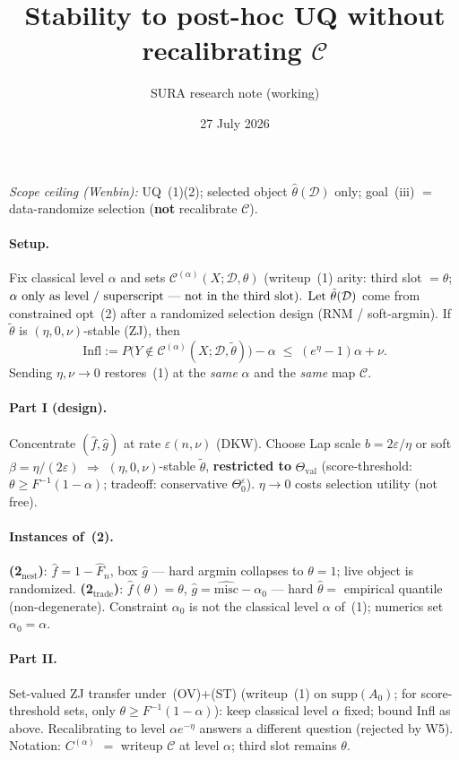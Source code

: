\documentclass[11pt]{article}
\title{Stability to post-hoc UQ without recalibrating \(\mathcal{C}\)}
\author{SURA research note (working)}
\date{27 July 2026}
\begin{document}
\maketitle
\thispagestyle{empty}
\vspace{-1.2em}
\noindent\textit{Scope ceiling (Wenbin):} UQ~(1)(2); selected object \(\hat\theta(\mathcal{D})\) only;
goal~(iii) $=$ data-randomize selection (\textbf{not} recalibrate \(\mathcal{C}\)).

\paragraph{Setup.}
Fix classical level \(\alpha\) and sets \(\mathcal{C}^{(\alpha)}(X;\mathcal{D},\theta)\)
(writeup~(1) arity: third slot $=\theta$; \(\alpha$ only as level / superscript --- not in the third slot).
Let \(\tilde\theta(\mathcal{D})\) come from constrained opt~(2) after a randomized selection design
(RNM / soft-argmin). If \(\tilde\theta\) is \((\eta,0,\nu)\)-stable (ZJ), then
\[
\mathrm{Infl}
:=
P\bigl(Y\notin\mathcal{C}^{(\alpha)}(X;\mathcal{D},\tilde\theta)\bigr)-\alpha
\;\le\;
(e^\eta-1)\alpha+\nu.
\]
Sending \(\eta,\nu\to0\) restores~(1) at the \emph{same} \(\alpha\) and the \emph{same} map \(\mathcal{C}\).

\paragraph{Part I (design).}
Concentrate \((\hat f,\hat g)\) at rate \(\varepsilon(n,\nu)\) (DKW).
Choose Lap scale \(b=2\varepsilon/\eta\) or soft \(\beta=\eta/(2\varepsilon)\)
\(\Rightarrow\) \((\eta,0,\nu)\)-stable \(\tilde\theta\), \textbf{restricted to}
\(\Theta_{\mathrm{val}}\) (score-threshold: \(\theta\ge F^{-1}(1-\alpha)\); tradeoff: conservative \(\Theta_0^\varepsilon\)).
\(\eta\to0\) costs selection utility (not free).

\paragraph{Instances of~(2).}
\textbf{(2$_{\mathrm{nest}}$)}: \(\hat f=1-\widehat F_n\), box \(\hat g\) --- hard argmin collapses to \(\theta=1\); live object is randomized.
\textbf{(2$_{\mathrm{trade}}$)}: \(\hat f(\theta)=\theta\), \(\hat g=\widehat{\mathrm{misc}}-\alpha_0\) --- hard \(\hat\theta=\) empirical quantile (non-degenerate).
Constraint $\alpha_0$ is not the classical level $\alpha$ of~(1); numerics set $\alpha_0=\alpha$.

\paragraph{Part II.}
Set-valued ZJ transfer under~(OV)+(ST) (writeup~(1) on $\mathrm{supp}(A_0)$;
for score-threshold sets, only $\theta\ge F^{-1}(1-\alpha)$): keep classical level $\alpha$ fixed;
bound Infl as above. Recalibrating to level $\alpha e^{-\eta}$ answers a different question (rejected by W5).
Notation: $C^{(\alpha)}$ $=$ writeup $\mathcal{C}$ at level $\alpha$; third slot remains $\theta$.
\end{document}
